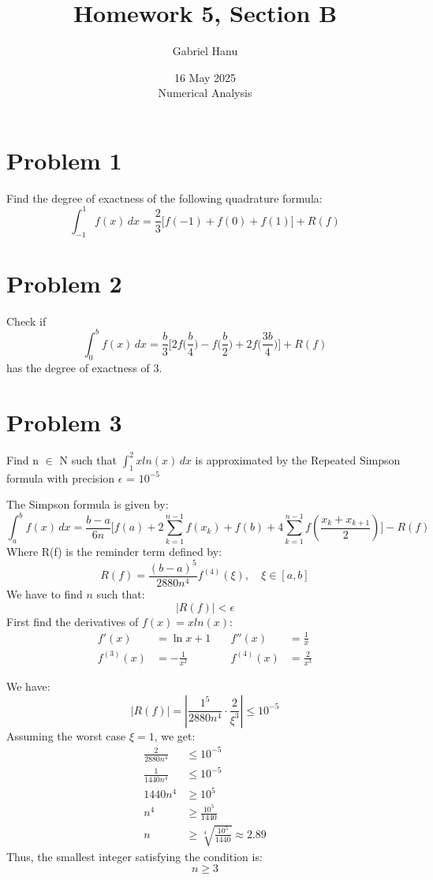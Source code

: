 \documentclass{article}
\title{Homework 5, Section B}
\author{Gabriel Hanu}
\date{16 May 2025 \\
Numerical Analysis}
\begin{document}
\maketitle

\section*{Problem 1}
Find the degree of exactness of the following quadrature formula:
\[
    \int_{-1}^{1} f(x) \, dx = \frac{2}{3} \big[f(-1) + f(0) + f(1)\big] +R(f)
\]

\section*{Problem 2}
Check if
\[
    \int_{0}^{b} f(x) \, dx = \frac{b}{3} \bigg[2f\bigg(\frac{b}{4}\bigg) - f\bigg(\frac{b}{2}\bigg) + 2f\bigg(\frac{3b}{4}\bigg)\bigg] +R(f)
\]
has the degree of exactness of 3.

\section*{Problem 3}
Find n \(\in\) N such that \( \int_{1}^{2} xln(x) \, dx \) is approximated by the Repeated Simpson formula with precision \(\epsilon\) = \(10^{-5}\)
\

The Simpson formula is given by:
\[
    \int_{a}^{b} f(x) \, dx = \frac{b-a}{6n} \bigg[f(a) + 2\sum_{k=1}^{n-1}f(x_k) + f(b) + 4\sum_{k=1}^{n-1}f(\frac{x_k + x_{k+1}}{2})\bigg] - R(f)
\]
Where R(f) is the reminder term defined by:
\[
    R(f) = \frac{(b-a)^5}{2880n^4}f^{(4)}(\xi), \quad \xi \in [a,b]
\]
We have to find \( n \) such that:
\[
    \big|R(f)\big| < \epsilon
\]
First find the derivatives of \( f(x) = xln(x) \):
\begin{align*}
f'(x) &= \ln x + 1 &\quad f''(x) &= \frac{1}{x} \\
f^{(3)}(x) &= -\frac{1}{x^2} &\quad f^{(4)}(x) &= \frac{2}{x^3}
\end{align*}

We have:
\[
    \left|R(f)\right| = \left| \frac{1^5}{2880n^4} \cdot \frac{2}{\xi^3} \right| \leq 10^{-5}
\]
Assuming the worst case \( \xi = 1 \), we get:
\begin{align*}
    \frac{2}{2880n^4} &\leq 10^{-5} \\
    \frac{1}{1440n^4} &\leq 10^{-5} \\
    1440n^4 &\geq 10^5 \\
    n^4 &\geq \frac{10^5}{1440} \\
    n &\geq \sqrt[4]{\frac{10^5}{1440}} \approx 2.89
\end{align*}
Thus, the smallest integer satisfying the condition is:
\[
    n \geq 3
\]
\end{document}
